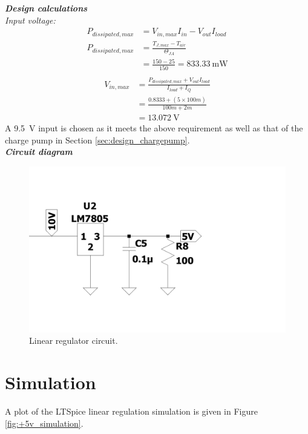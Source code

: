 \noindent\textbf{\textit{Design calculations}} \\
\textit{Input voltage:}
\begin{equation*}
    \begin{split}
        P_{dissipated,max} &=  V_{in,max}I_{in} - V_{out}I_{load} \\
        P_{dissipated,max} &= \frac{T_{J,max} - T_{air}}{\Theta_{JA}} \\
        &=\frac{150-25}{150}=\SI{833.33}{\milli\watt} \\
    \end{split}
\end{equation*}
\begin{equation}
    \begin{split}
        V_{in,max} &= \frac{P_{dissipated,max} + V_{out}I_{load}}{I_{load}+I_Q} \\ 
        &=\frac{0.8333+(5 \times 100m)}{100m+2m} \\
        &=\SI{13.072}{\volt}
    \end{split}
    \label{eq:linear_input}
\end{equation}
A \SI{9.5}{\volt} input is chosen as it meets the above requirement as well as that of the charge pump in Section \ref{sec:design_chargepump}.
\\

\noindent\textbf{\textit{Circuit diagram}} \label{subsec:design_linear_circuit}
\begin{figure}[h]
 \centering
  	\includegraphics[width=0.75\linewidth,clip,trim = 0cm 3cm 0cm 3cm]{./Figures/linear_circuit.pdf}
  	\caption{Linear regulator circuit.}
  	\label{fig:linear_circuit}
 \end{figure}
 
 

\section{Simulation} \label{sec:simulation_linear}
A plot of the LTSpice linear regulation simulation is given in Figure \ref{fig:+5v_simulation}.

